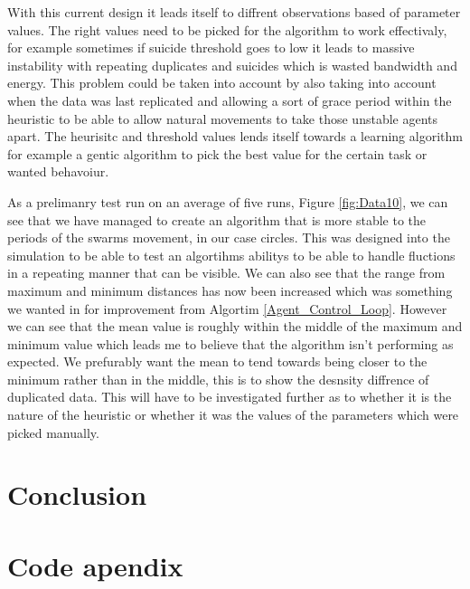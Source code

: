 \documentclass{UoYCSproject}
\begin{document}
With this current design it leads itself to diffrent observations based of parameter values.
The right values need to be picked for the algorithm to work effectivaly, for example sometimes if suicide threshold goes to low it leads to massive instability with repeating duplicates and suicides which is wasted bandwidth and energy.
This problem could be taken into account by also taking into account when the data was last replicated and allowing a sort of grace period within the heuristic to be able to allow natural movements to take those unstable agents apart.
The heurisitc and threshold values lends itself towards a learning algorithm for example a gentic algorithm to pick the best value for the certain task or wanted behavoiur.

As a prelimanry test run on an average of five runs, Figure \ref{fig:Data10}, we can see that we have managed to create an algorithm that is more stable to the periods of the swarms movement, in our case circles.
This was designed into the simulation to be able to test an algortihms abilitys to be able to handle fluctions in a repeating manner that can be visible.
We can also see that the range from maximum and minimum distances has now been increased which was something we wanted in for improvement from Algortim \ref{Agent_Control_Loop}.
However we can see that the mean value is roughly within the middle of the maximum and minimum value which leads me to believe that the algorithm isn't performing as expected.
We prefurably want the mean to tend towards being closer to the minimum rather than in the middle, this is to show the desnsity diffrence of duplicated data.
This will have to be investigated further as to whether it is the nature of the heuristic or whether it was the values of the parameters which were picked manually.




\chapter{Conclusion}
\label{cha:conclusion}


\appendix
\chapter{Code apendix}
\end{document}
